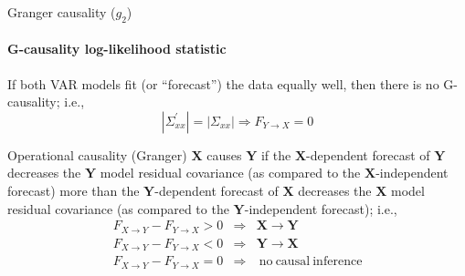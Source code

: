\documentclass{beamer}
\begin{document}
\begin{frame}{Granger causality ($g_2$)}
\framesubtitle{G-causality log-likelihood statistic}
If both VAR models fit (or ``forecast'') the data equally well, then there is no G-causality; i.e.,\\
\begin{equation*}
|\Sigma_{xx}^\prime| = |\Sigma_{xx}| \Rightarrow F_{Y\rightarrow X} = 0
\end{equation*}
\pause
\begin{block}{Operational causality (Granger)}
$\mathbf{X}$ causes $\mathbf{Y}$ if the $\mathbf{X}$-dependent forecast of $\mathbf{Y}$ decreases the $\mathbf{Y}$ model residual covariance (as compared to the $\mathbf{X}$-independent forecast) more than the $\mathbf{Y}$-dependent forecast of $\mathbf{X}$ decreases the $\mathbf{X}$ model residual covariance (as compared to the $\mathbf{Y}$-independent forecast); i.e.,
\begin{eqnarray*}
F_{X\rightarrow Y}-F_{Y\rightarrow X}>0&\Rightarrow& \mathbf{X}\rightarrow\mathbf{Y}\\
F_{X\rightarrow Y}-F_{Y\rightarrow X}<0&\Rightarrow& \mathbf{Y}\rightarrow\mathbf{X}\\
F_{X\rightarrow Y}-F_{Y\rightarrow X}=0&\Rightarrow& \mathrm{\ no\ causal\ inference}\\
\end{eqnarray*}
\end{block}
\end{frame}
\end{document}
